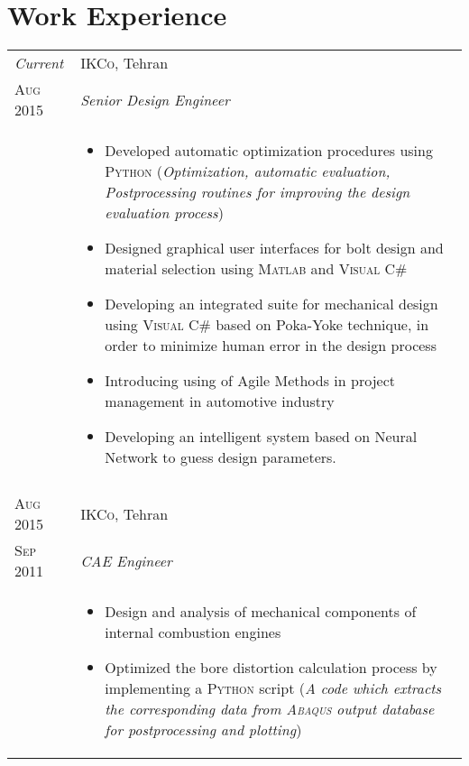 \documentclass[a4paper,9pt]{article}
\begin{document}
\section{Work Experience}
\begin{longtable}{p{1.7cm}|p{13.3cm}}
 \emph{Current} & \textsc{IKCo}, Tehran \\
 \textsc{Aug 2015} & \emph{Senior Design Engineer}\\
 &
 \begin{itemize}[leftmargin=*]
 
 
 
 \item{\footnotesize{Developed automatic optimization procedures using \textsc{Python} (\textit{Optimization, automatic evaluation, Postprocessing routines for improving the design evaluation process})}}
 
 \item{\footnotesize{Designed graphical user interfaces for bolt design and material selection using \textsc{Matlab} and \textsc{Visual C\#}}}
 
 \item{\footnotesize{Developing an integrated suite for mechanical design using \textsc{Visual C\#} based on Poka-Yoke technique, in order to minimize human error in the design process}}
 
 \item{\footnotesize{Introducing using of Agile Methods in project management in automotive industry}}
 
 \item{\footnotesize{Developing an intelligent system based on Neural Network to guess design parameters.}}
 
 \end{itemize}\\\multicolumn{2}{c}{}\\
 
 
 \textsc{Aug 2015} & \textsc{IKCo}, Tehran \\
 \textsc{Sep 2011}&\emph{CAE Engineer}\\
 &
 \begin{itemize}[leftmargin=*]
 \item{\footnotesize{Design and analysis of mechanical components of internal combustion engines }}
 
 \item{\footnotesize{Optimized the bore distortion calculation process by implementing a \textsc{Python} script (\textit{A code which extracts the corresponding data from \textsc{Abaqus} output database for postprocessing and plotting})}}
 

\end{itemize}
\end{longtable}
\end{document}
